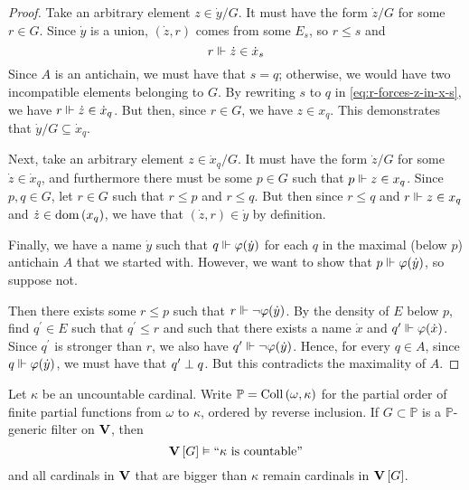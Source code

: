 \documentclass[11pt]{article}
\renewcommand{\P}{\mathbb{P}}
\renewcommand{\phi}{\varphi}
\DeclareMathOperator{\collOp}{Coll}
\newcommand{\coll}[1]{\collOp{\parens{#1}}}
\begin{document}
\begin{proof}
    Take an arbitrary element $z \in \dot y / G$.
    It must have the form $\dot z / G$
    for some $r \in G$.
    Since $\dot y$ is a union,
    $(\dot z, r)$ comes from some $E_s$,
    so $r \leq s$ and
    \begin{equation}
        \label{eq:r-forces-z-in-x-s}
        r \Vdash \dot z \in \dot x_s
    \end{equation}
    Since $A$ is an antichain, we must have that $s = q$;
    otherwise, we would have two incompatible elements belonging to $G$.
    By rewriting $s$ to $q$ in \eqref{eq:r-forces-z-in-x-s}, we have
    $r \Vdash \dot z \in \dot x_q$.
    But then, since $r \in G$, we have $z \in x_q$.
    This demonstrates that $\dot y / G \subseteq \dot x_q$.

    Next, take an arbitrary element $z \in \dot x_q / G$.
    It must have the form $\dot z / G$
    for some $\dot z \in \dot x_q$,
    and furthermore there must be some $p \in G$ such that
    $p \Vdash z \in x_q$.
    Since $p, q \in G$, let $r \in G$ such that $r \leq p$ and $r \leq q$.
    But then since $r \leq q$
    and $r \Vdash z \in x_q$
    and $\dot z \in \operatorname{dom}{\left(x_q\right)}$,
    we have that $(\dot z, r) \in \dot y$ by definition.

    Finally, we have a name $\dot y$ such that $q \forces \phi(\dot y)$ for
    each $q$ in the maximal (below $p$) antichain $A$ that we started with.
    However, we want to show that $p \forces \phi(\dot y)$, so
    suppose not.

    Then there exists some $r \leq p$ such that $r \forces \neg \phi(\dot y)$.
    By the density of $E$ below $p$, find $q^\prime \in E$ such that
    $q^\prime \leq r$ and
    such that there exists a name $\dot x$ and $q^\prime \forces \phi(\dot x)$.
    Since $q^\prime$ is stronger than $r$, we also have
    $q^\prime \forces \neg \phi(\dot y)$.
    Hence, for every $q \in A$, since $q \forces \phi(\dot y)$, we must have
    that $q^\prime \perp q$.
    But this contradicts the maximality of $A$.
\end{proof}

\begin{prop}
    Let $\kappa$ be an uncountable cardinal.
    Write $\P = \coll{\omega, \kappa}$ for the partial order of finite partial
    functions from $\omega$ to $\kappa$, ordered by reverse inclusion.
    If $G \subset \P$ is a $\P$-generic filter on $\verum$, then
    \begin{equation*}
        \verum[G] \models \stmt{$\kappa$ is countable}
    \end{equation*}
    and all cardinals in $\verum$ that are bigger than $\kappa$ remain
    cardinals in $\verum[G]$.
\end{prop}
\end{document}

